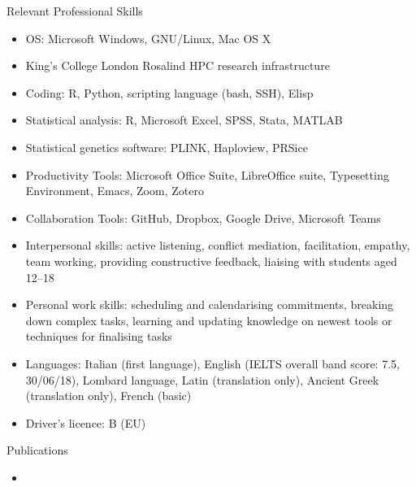 \documentclass{resume2} %
\begin{document}
\begin{rSection}{Relevant Professional Skills}
\begin{multicols}{2}[]
  \begin{itemize}
    \item OS: Microsoft Windows, GNU\slash Linux, Mac OS X
    \item King's College London Rosalind HPC research infrastructure
    \item Coding: R, Python, scripting language (bash, SSH), Elisp
    \item Statistical analysis: R, Microsoft Excel, SPSS, Stata, MATLAB
    \item Statistical genetics software: PLINK, Haploview, PRSice
	\item Productivity Tools: Microsoft Office Suite, LibreOffice suite, \LaTeXe \hspace{.1mm} Typesetting Environment, Emacs, Zoom, Zotero
    \item Collaboration Tools: GitHub, Dropbox, Google Drive, Microsoft Teams
    \item Interpersonal skills: active listening, conflict mediation, facilitation, empathy, team working, providing constructive feedback, liaising with students aged 12--18
    \item Personal work skills: scheduling and calendarising commitments, breaking down complex tasks, learning and updating knowledge on newest tools or techniques for finalising tasks
    \item Languages: Italian (first language), English (IELTS overall band score: 7.5, 30/06/18), Lombard language, Latin (translation only), Ancient Greek (translation only), French (basic)
    \item Driver's licence: B (EU)
\end{itemize}
\end{multicols}
\end{rSection}

\begin{rSection}{Publications}
  
  \begin{itemize}
    \item {}
  \end{itemize}
\end{rSection}
\end{document}
